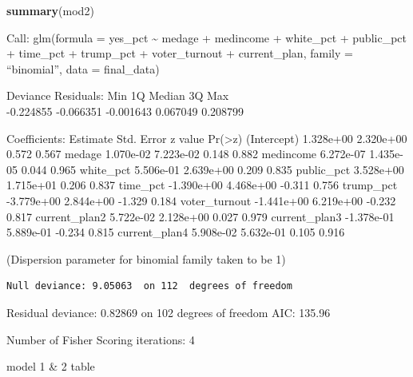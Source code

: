 \documentclass[
]{article}
\newenvironment{Shaded}{\begin{snugshade}}{\end{snugshade}}
\newcommand{\KeywordTok}[1]{\textcolor[rgb]{0.13,0.29,0.53}{\textbf{#1}}}
\newcommand{\NormalTok}[1]{#1}
\begin{document}
\begin{Shaded}
\begin{Highlighting}[]
\KeywordTok{summary}\NormalTok{(mod2)}
\end{Highlighting}
\end{Shaded}

Call: glm(formula = yes\_pct \textasciitilde{} medage + medincome +
white\_pct + public\_pct + time\_pct + trump\_pct + voter\_turnout +
current\_plan, family = ``binomial'', data = final\_data)

Deviance Residuals: Min 1Q Median 3Q Max\\
-0.224855 -0.066351 -0.001643 0.067049 0.208799

Coefficients: Estimate Std. Error z value
Pr(\textgreater\textbar z\textbar) (Intercept) 1.328e+00 2.320e+00 0.572
0.567 medage 1.070e-02 7.223e-02 0.148 0.882 medincome 6.272e-07
1.435e-05 0.044 0.965 white\_pct 5.506e-01 2.639e+00 0.209 0.835
public\_pct 3.528e+00 1.715e+01 0.206 0.837 time\_pct -1.390e+00
4.468e+00 -0.311 0.756 trump\_pct -3.779e+00 2.844e+00 -1.329 0.184
voter\_turnout -1.441e+00 6.219e+00 -0.232 0.817 current\_plan2
5.722e-02 2.128e+00 0.027 0.979 current\_plan3 -1.378e-01 5.889e-01
-0.234 0.815 current\_plan4 5.908e-02 5.632e-01 0.105 0.916

(Dispersion parameter for binomial family taken to be 1)

\begin{verbatim}
Null deviance: 9.05063  on 112  degrees of freedom
\end{verbatim}

Residual deviance: 0.82869 on 102 degrees of freedom AIC: 135.96

Number of Fisher Scoring iterations: 4

model 1 \& 2 table
\end{document}
